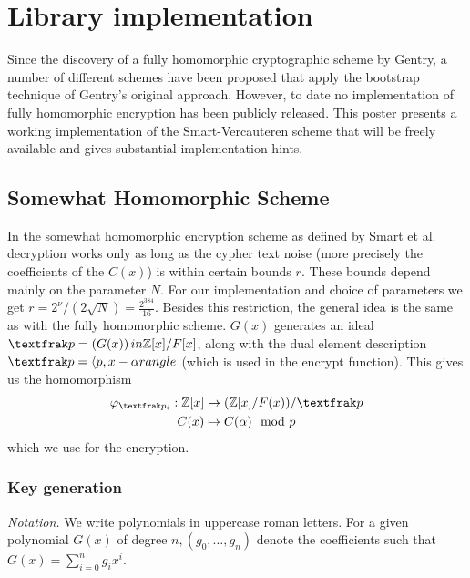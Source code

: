 

\section{Library implementation}

Since the discovery of a fully homomorphic cryptographic scheme by Gentry, a number of different schemes have been proposed that apply the bootstrap technique of Gentry's original approach. However, to date no implementation of fully homomorphic encryption has been publicly released. This poster presents a working implementation of the Smart-Vercauteren scheme that will be freely available and gives substantial implementation hints.

\subsection{Somewhat Homomorphic Scheme}

In the somewhat homomorphic encryption scheme as defined by Smart et al. decryption works only as long as the cypher text noise (more precisely the coefficients of the $C(x)$) is within certain bounds $r$. These bounds depend mainly on the parameter $N$. For our implementation and choice of parameters we get $r = 2^\nu / (2 \sqrt{N}) = \frac{2^384}{16}$. Besides this restriction, the general idea is the same as with the fully homomorphic scheme. $G(x)$ generates an ideal $\tfr{p} = \left(G(x)\right) in \bb{Z}[x]/F[x]$, along with the dual element description $\tfr{p} = \langle p, x - \alpha rangle$ (which is used in the encrypt function). This gives us the homomorphism
\begin{align*}
\varphi_{\tfr{p}_i}: \bb{Z}[x] &\rightarrow (\bb{Z}[x]/F(x))/\tfr{p}\\
C(x) &\mapsto C(\alpha) \mod{p}
\end{align*}
which we use for the encryption.

\subsubsection{Key generation}

\emph{Notation.} We write polynomials in uppercase roman letters. For a given polynomial $G(x)$ of degree $n, (g_0, \ldots, g_n)$ denote the coefficients such that $G(x) = \sum_{i=0}^{n}{g_i x^i}$.





